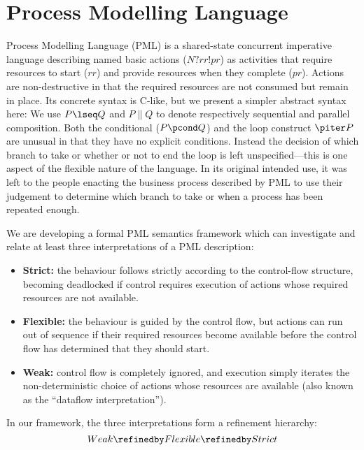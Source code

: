 \section{Process Modelling Language}\label{ha:PML}

Process Modelling Language (PML) \cite{DBLP:journals/infsof/AtkinsonWN07}
is a shared-state concurrent imperative language
describing named basic actions ($N?rr!pr$) as
activities that require resources to start ($rr$)
and provide resources when they complete ($pr$).
Actions are non-destructive in that the required resources are
not consumed but remain in place.
Its concrete syntax is C-like, but we present a simpler abstract syntax here:
We use $P \lseq Q$ and $P \parallel Q$ to denote
respectively sequential and parallel composition.
Both the conditional ($P \pcond Q$) and the loop construct $\piter P$
are unusual in that they have no explicit conditions.
Instead the decision of which branch to take or whether or not to end the loop
is left unspecified---this is one aspect of the flexible nature of the language.
In its original intended use, it was left to the people enacting the business
process described by PML to use their judgement to determine which branch to take
or when a process has been repeated enough.

We are developing a formal PML semantics framework which
 can investigate and relate at least three interpretations of
a PML description:
\begin{itemize}
  \item \textbf{Strict:}
    the behaviour follows strictly according to the control-flow structure,
    becoming deadlocked if control requires execution of actions
    whose required resources are not available.
  \item \textbf{Flexible:}
    the behaviour is guided by the control flow,
    but actions can run out of sequence if their required resources become available
    before the control flow has determined that they should start.
  \item \textbf{Weak:}
    control flow is completely ignored,
    and execution simply iterates the non-deterministic choice of actions
    whose resources are available (also known as the ``dataflow interpretation'').
\end{itemize}
In our framework, the three interpretations form a refinement hierarchy:
\begin{equation*}
  Weak \refinedby Flexible \refinedby Strict
\end{equation*}

